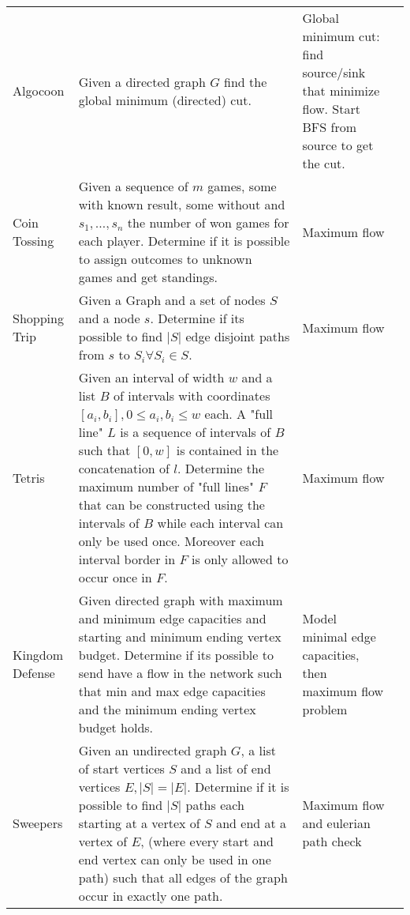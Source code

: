 \documentclass[a4paper, 10pt]{article}
\begin{document}
\begin{longtable}{ L{2cm} L{8cm} L{4cm} r}
        Algocoon 
        & Given a directed graph $G$ find the global minimum (directed) cut.
        & Global minimum cut: find source/sink that minimize flow. Start BFS from source to get the cut. &  \pageref{sec:algocoon} \\

        Coin Tossing
        & Given a sequence of $m$ games, some with known result, some without and $s_1,\dots,s_n$ the number of won games for each player.
            Determine if it is possible to assign outcomes to unknown games and get standings.
        & Maximum flow &  \pageref{sec:coin_tossing} \\

        Shopping Trip 
        & Given a Graph and a set of nodes $S$ and a node $s$. 
            Determine if its possible to find $|S|$ edge disjoint paths from $s$ to $S_i \forall S_i \in S$. 
        & Maximum flow &  \pageref{sec:shopping_trip} \\

        Tetris 
        & Given an interval of width $w$ and a list $B$ of intervals with coordinates $[a_i,b_i], 0\leq a_i,b_i \leq w$ each.
            A "full line" $L$ is a sequence of intervals of $B$ such that $[0,w]$ is contained in the concatenation of $l$.
            Determine the maximum number of "full lines" $F$ that can be constructed using the intervals of $B$ while each interval
            can only be used once. Moreover each interval border in $F$ is only allowed to occur once in $F$.
            & Maximum flow &  \pageref{sec:tetris} \\

        Kingdom Defense 
        & Given directed graph with maximum and minimum edge capacities and starting and minimum ending vertex budget.
            Determine if its possible to send have a flow in the network such that min and max edge capacities and the minimum ending vertex budget holds.            
        & Model minimal edge capacities, then maximum flow problem &  \pageref{sec:kingdom_defense} \\

        Sweepers 
        & Given an undirected graph $G$, a list of start vertices $S$ and a list of end vertices $E, |S|=|E|$.
            Determine if it is possible to find $|S|$ paths each starting at a vertex of $S$ and end at a vertex of $E$, 
            (where every start and end vertex can only be used in one path) such that all edges of the graph occur in exactly one path.   
        & Maximum flow and eulerian path check &  \pageref{sec:sweepers} \\


\end{longtable}
\end{document}
